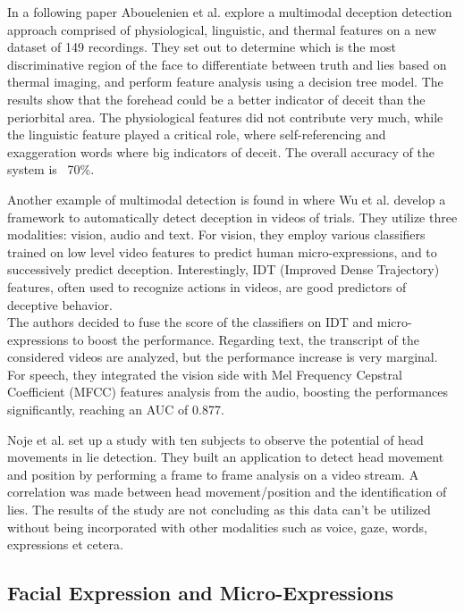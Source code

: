 In a following paper \cite{7782429} Abouelenien et al. explore a multimodal deception detection approach comprised of physiological, linguistic, and thermal features on a new dataset of 149 recordings. They set out to determine which is the most discriminative region of the face to differentiate between truth and lies based on thermal imaging, and perform feature analysis using a decision tree model. The results show that the forehead could be a better indicator of deceit than the periorbital area. The physiological features did not contribute very much, while the linguistic feature played a critical role, where self-referencing and exaggeration words where big indicators of deceit. The overall accuracy of the system is ~70\%.

Another example of multimodal detection is found in \cite{DBLP:journals/corr/abs-1712-04415} where Wu et al. develop a framework to automatically detect deception in videos of trials. They utilize three modalities: vision, audio and text. For vision, they employ various classifiers trained on low level video features to predict human micro-expressions, and to successively predict deception. Interestingly, IDT (Improved Dense Trajectory) features, often used to recognize actions in videos, are good predictors of deceptive behavior. \\
The authors decided to fuse the score of the classifiers on IDT and micro-expressions to boost the performance. Regarding text, the transcript of the considered videos are analyzed, but the performance increase is very marginal. \\
For speech, they integrated the vision side with Mel Frequency Cepstral Coefficient (MFCC) features analysis from the audio, boosting the performances significantly, reaching an AUC of 0.877. 

Noje et al. \cite{7367432} set up a study with ten subjects to observe the potential of head movements in lie detection. They built an application to detect head movement and position by performing a frame to frame analysis on a video stream. A correlation was made between head movement/position and the identification of lies. The results of the study are not concluding as this data can't be utilized without being incorporated with other modalities such as voice, gaze, words, expressions et cetera.

\subsection*{Facial Expression and Micro-Expressions}

